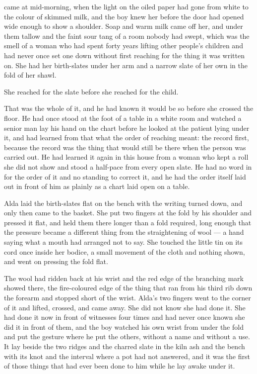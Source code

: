 \scenebreak

 came at mid-morning, when the light on the oiled paper had gone from white to the colour of skimmed milk, and the boy knew her before the door had opened wide enough to show a shoulder. Soap and warm milk came off her, and under them tallow and the faint sour tang of a room nobody had swept, which was the smell of a woman who had spent forty years lifting other people's children and had never once set one down without first reaching for the thing it was written on. She had her birth-slates under her arm and a narrow slate of her own in the fold of her shawl.

She reached for the slate before she reached for the child.

That was the whole of it, and he had known it would be so before she crossed the floor. He had once stood at the foot of a table in a white room and watched a senior man lay his hand on the chart before he looked at the patient lying under it, and had learned from that what the order of reaching meant: the record first, because the record was the thing that would still be there when the person was carried out. He had learned it again in this house from a woman who kept a roll she did not show and stood a half-pace from every open slate. He had no word in  for the order of it and no standing to correct it, and he had the order itself laid out in front of him as plainly as a chart laid open on a table.

Alda laid the birth-slates flat on the bench with the writing turned down, and only then came to the basket. She put two fingers at the fold by his shoulder and pressed it flat, and held them there longer than a fold required, long enough that the pressure became a different thing from the straightening of wool --- a hand saying what a mouth had arranged not to say. She touched the little tin on its cord once inside her bodice, a small movement of the cloth and nothing shown, and went on pressing the fold flat.

The wool had ridden back at his wrist and the red edge of the branching mark showed there, the fire-coloured edge of the thing that ran from his third rib down the forearm and stopped short of the wrist. Alda's two fingers went to the corner of it and lifted, crossed, and came away. She did not know she had done it. She had done it now in front of witnesses four times and had never once known she did it in front of them, and the boy watched his own wrist from under the fold and put the gesture where he put the others, without a name and without a use. It lay beside the two ridges and the charred slate in the kiln ash and the bench with its knot and the interval where a pot had not answered, and it was the first of those things that had ever been done to him while he lay awake under it.

